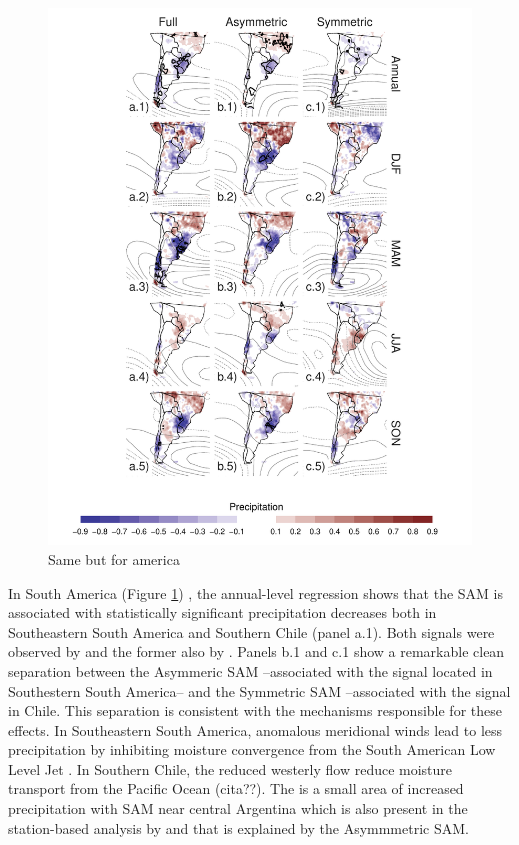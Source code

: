 \documentclass[]{ametsocV5}
\begin{document}
\begin{figure}
\includegraphics{pp-regr-america-1} \caption[Same but for america]{Same but for america}\label{fig:pp-regr-america}
\end{figure}

In South America (Figure \ref{fig:pp-regr-america}) , the annual-level
regression shows that the SAM is associated with statistically
significant precipitation decreases both in Southeastern South America
and Southern Chile (panel a.1). Both signals were observed by
\citet{silvestri2009} and the former also by \citet{gillett2006}. Panels
b.1 and c.1 show a remarkable clean separation between the Asymmeric SAM
--associated with the signal located in Southestern South America-- and
the Symmetric SAM --associated with the signal in Chile. This separation
is consistent with the mechanisms responsible for these effects. In
Southeastern South America, anomalous meridional winds lead to less
precipitation by inhibiting moisture convergence from the South American
Low Level Jet \citep{silvestri2009}. In Southern Chile, the reduced
westerly flow reduce moisture transport from the Pacific Ocean (cita??).
The is a small area of increased precipitation with SAM near central
Argentina which is also present in the station-based analysis by
\citet{gillett2006} and that is explained by the Asymmmetric SAM.
\end{document}
